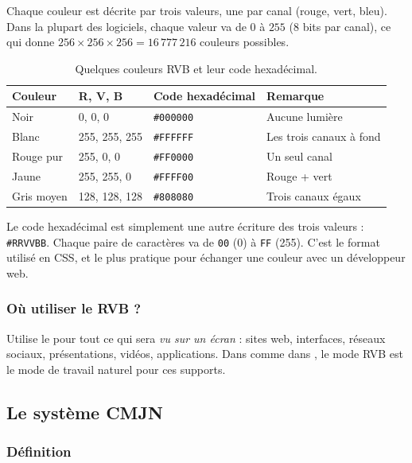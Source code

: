 Chaque couleur est décrite par trois valeurs, une par canal (rouge, vert, bleu). Dans la plupart des logiciels, chaque valeur va de $0$ à $255$ (8 bits par canal), ce qui donne $256 \times 256 \times 256 = 16\,777\,216$ couleurs possibles.

\begin{table}[h!]
\centering
\begin{tabular}{@{}llll@{}}
\toprule
\textbf{Couleur} & \textbf{R, V, B} & \textbf{Code hexadécimal} & \textbf{Remarque} \\
\midrule
Noir & 0, 0, 0 & \texttt{\#000000} & Aucune lumière \\
Blanc & 255, 255, 255 & \texttt{\#FFFFFF} & Les trois canaux à fond \\
Rouge pur & 255, 0, 0 & \texttt{\#FF0000} & Un seul canal \\
Jaune & 255, 255, 0 & \texttt{\#FFFF00} & Rouge + vert \\
Gris moyen & 128, 128, 128 & \texttt{\#808080} & Trois canaux égaux \\
\bottomrule
\end{tabular}
\caption{Quelques couleurs RVB et leur code hexadécimal.}
\end{table}

\begin{astuce}
Le code hexadécimal est simplement une autre écriture des trois valeurs : \texttt{\#RRVVBB}. Chaque paire de caractères va de \texttt{00} (0) à \texttt{FF} (255). C'est le format utilisé en CSS, et le plus pratique pour échanger une couleur avec un développeur web.
\end{astuce}

\subsubsection{Où utiliser le RVB ?}

Utilise le  pour tout ce qui sera \emph{vu sur un écran} : sites web, interfaces, réseaux sociaux, présentations, vidéos, applications. Dans  comme dans , le mode RVB est le mode de travail naturel pour ces supports.

\subsection{Le système CMJN}

\subsubsection{Définition}

